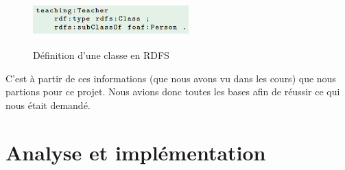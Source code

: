 \documentclass{article}
\begin{document}
\begin{figure}[!ht]
    \center
    \includegraphics[width=6cm, height=2cm]{img/schema_rdfs}
    \caption{Définition d'une classe en RDFS}
\end{figure}

C'est à partir de ces informations (que nous avons vu dans les cours) que nous partions pour ce projet. Nous avions donc toutes les bases afin de réussir ce qui nous était demandé.

\section{Analyse et implémentation}
\end{document}
